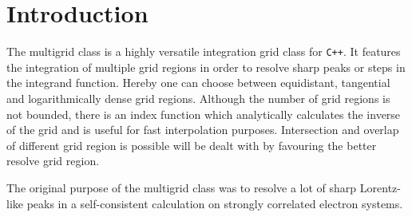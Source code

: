 \chapter{Introduction}

The multigrid class is a highly versatile integration grid class for \texttt{C++}. It features the integration of multiple grid regions in order to resolve sharp peaks or steps in the integrand function. Hereby one can choose between equidistant, tangential and logarithmically dense grid regions. Although the number of grid regions is not bounded, there is an index function which analytically calculates the inverse of the grid and is useful for fast interpolation purposes. Intersection and overlap of different grid region is possible will be dealt with by favouring the better resolve grid region.

The original purpose of the multigrid class was to resolve a lot of sharp Lorentz-like peaks in a self-consistent calculation on strongly correlated electron systems.

